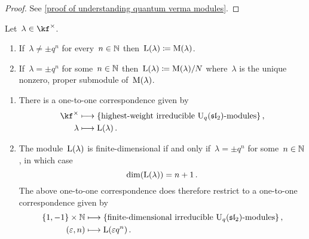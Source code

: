 \documentclass[a4paper, 11pt, oneside]{scrartcl}
\begin{document}
\begin{proof}
  See \cref{proof of understanding quantum verma modules}.
\end{proof}

\begin{definition}
  Let~$\lambda \in \kf^\times$.
  \begin{enumerate}
    \item
      If~$\lambda \neq \pm q^n$ for every~$n \in \mathbb{N}$ then~$\operatorname{L}(\lambda) \coloneqq \operatorname{M}(\lambda)$.
    \item
      If~$\lambda = \pm q^n$ for some~$n \in \mathbb{N}$ then~$\operatorname{L}(\lambda) \coloneqq \operatorname{M}(\lambda)/N$ where~$\lambda$ is the unique nonzero, proper submodule of~$\operatorname{M}(\lambda)$.
  \end{enumerate}
\end{definition}

\begin{theorem}
  \leavevmode
  \begin{enumerate}
    \item
      There is a one-to-one correspondence given by
      \begin{align*}
        \kf^\times
        &\longmapsto
        \{
          \text{highest-weight irreducible~\modules{$\Univ_q(\sllie_2)$}}
        \} \,,
        \\
        \lambda
        &\longmapsto
        \irred(\lambda) \,.
      \end{align*}
    \item
      The module~$\operatorname{L}(\lambda)$ is finite-dimensional if and only if~$\lambda = \pm q^n$ for some~$n \in \mathbb{N}$, in which case
      \[
        \dim(\operatorname{L}(\lambda))
        =
        n + 1 \,.
      \]
      The above one-to-one correspondence does therefore restrict to a one-to-one correspondence given by
      \begin{align*}
        \{ 1, -1 \} \times \Natural
        &\longmapsto
        \{
          \text{finite-dimensional irreducible~\modules{$\Univ_q(\sllie_2)$}}
        \} \,,
        \\
        (\varepsilon, n)
        &\longmapsto
        \irred(\varepsilon q^n) \,.
      \end{align*}
  \end{enumerate}
\end{theorem}


\end{document}
